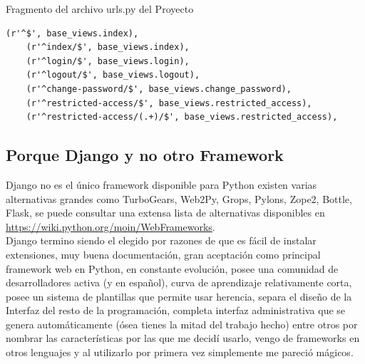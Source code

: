 Fragmento del archivo urls.py del Proyecto\\[0.1cm]

\begin{lstlisting}[style=HTML]
    (r'^$', base_views.index),
    (r'^index/$', base_views.index),
    (r'^login/$', base_views.login),
    (r'^logout/$', base_views.logout),
    (r'^change-password/$', base_views.change_password),
    (r'^restricted-access/$', base_views.restricted_access),
    (r'^restricted-access/(.+)/$', base_views.restricted_access),
\end{lstlisting}

\vspace{0.1cm}


\subsection{Porque Django y no otro Framework}

Django no es el único framework disponible para Python existen varias alternativas grandes como TurboGears, Web2Py, Grops, Pylons, Zope2, Bottle, Flask, se puede consultar una extensa lista de alternativas disponibles en \url{https://wiki.python.org/moin/WebFrameworks}. 
\\
Django termino siendo el elegido por razones de que es fácil de instalar extensiones, muy buena documentación, gran aceptación como principal framework web en Python, en constante evolución, posee una comunidad de desarrolladores activa (y en español), curva de aprendizaje relativamente corta, posee un sistema de plantillas que permite usar herencia, separa el diseño de la Interfaz del resto de la programación, completa interfaz administrativa que se genera automáticamente (ósea tienes la mitad del trabajo hecho) entre otros por nombrar las características por las que me decidí usarlo, vengo de frameworks en otros lenguajes y al utilizarlo por primera vez simplemente me pareció mágicos.



